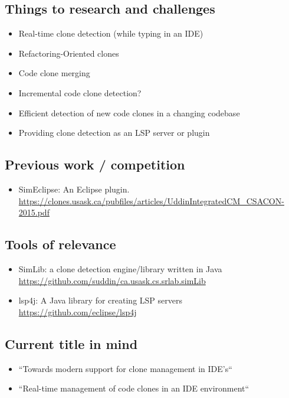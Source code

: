 \documentclass[12pt]{article}
\begin{document}
\subsection*{Things to research and challenges}
\begin{itemize}
    \item Real-time clone detection (while typing in an IDE)
    \item Refactoring-Oriented clones
    \item Code clone merging
    \item Incremental code clone detection?
    \item Efficient detection of new code clones in a changing codebase
    \item Providing clone detection as an LSP server or plugin
\end{itemize}

\subsection*{Previous work / competition}
\begin{itemize}
    \item SimEclipse: An Eclipse plugin. \url{https://clones.usask.ca/pubfiles/articles/UddinIntegratedCM_CSACON-2015.pdf}
\end{itemize}

\subsection*{Tools of relevance}
\begin{itemize}
    \item SimLib: a clone detection engine/library written in Java 
        \url{https://github.com/suddin/ca.usask.cs.srlab.simLib}
    \item lsp4j: A Java library for creating LSP servers \url{https://github.com/eclipse/lsp4j}
\end{itemize}

\subsection*{Current title in mind}
\begin{itemize}
    \item ``Towards modern support for clone management in IDE's``
    \item ``Real-time management of code clones in an IDE environment``
\end{itemize}
\end{document}
